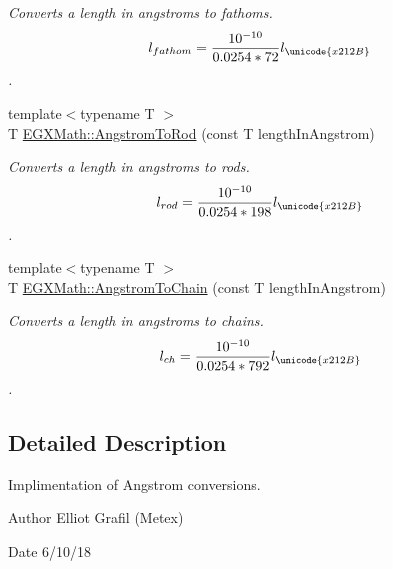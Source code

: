 \begin{DoxyCompactItemize}
\begin{DoxyCompactList}\small\item\em Converts a length in angstroms to fathoms. \[ l_{fathom}= \frac{10^{-10}}{0.0254 * 72} l_{\unicode{x212B}} \]. \end{DoxyCompactList}\item 
{\footnotesize template$<$typename T $>$ }\\T \mbox{\hyperlink{group___e_g_x_math-_conversions-_length_conversions-_non-_s_i-_angstrom-_surveyors_gaf6080801cd8901dc21f80eed4ec3e421}{E\+G\+X\+Math\+::\+Angstrom\+To\+Rod}} (const T length\+In\+Angstrom)
\begin{DoxyCompactList}\small\item\em Converts a length in angstroms to rods. \[ l_{rod}= \frac{10^{-10}}{0.0254 * 198} l_{\unicode{x212B}} \]. \end{DoxyCompactList}\item 
{\footnotesize template$<$typename T $>$ }\\T \mbox{\hyperlink{group___e_g_x_math-_conversions-_length_conversions-_non-_s_i-_angstrom-_surveyors_ga76c09fcaebaf5049097b7d555c3f2f49}{E\+G\+X\+Math\+::\+Angstrom\+To\+Chain}} (const T length\+In\+Angstrom)
\begin{DoxyCompactList}\small\item\em Converts a length in angstroms to chains. \[ l_{ch}= \frac{10^{-10}}{0.0254 * 792} l_{\unicode{x212B}} \]. \end{DoxyCompactList}\end{DoxyCompactItemize}


\subsection{Detailed Description}
Implimentation of Angstrom conversions. 

\begin{DoxyAuthor}{Author}
Elliot Grafil (Metex) 
\end{DoxyAuthor}
\begin{DoxyDate}{Date}
6/10/18 
\end{DoxyDate}
